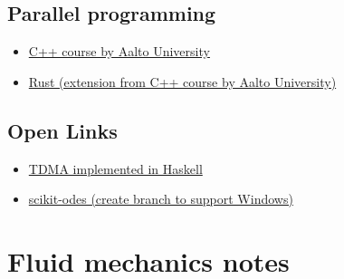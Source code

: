 \subsection{Parallel programming}

\begin{itemize}
	\item\href{https://ppc.cs.aalto.fi/}
	{C++ course by Aalto University}
	\item\href{https://ppc.cs.aalto.fi/}
	{Rust (extension from C++ course by Aalto University)}
\end{itemize}

\subsection{Open Links}

\begin{itemize}
	\item\href{https://zims-en.kiwix.campusafrica.gos.orange.com/wikibooks_en_all_maxi/A/Algorithm_Implementation/Linear_Algebra/Tridiagonal_matrix_algorithm}
	{TDMA implemented in Haskell}
	\item\href{https://github.com/bmcage/odes}
	{scikit-odes (create branch to support Windows)}
\end{itemize}

\section{Fluid mechanics notes}


